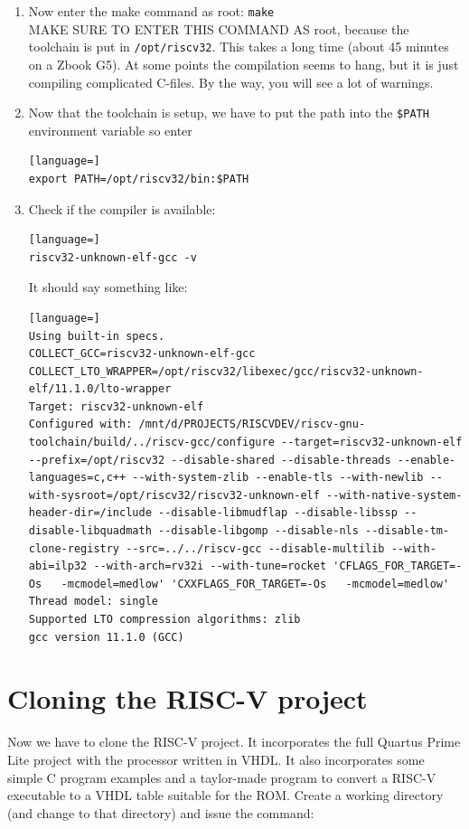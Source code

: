 \documentclass[12pt]{article}
\begin{document}
\begin{enumerate}
\item Now enter the make command as root: \lstinline|make|\\
MAKE SURE TO ENTER THIS COMMAND AS root, because the toolchain is put in \lstinline|/opt/riscv32|. This takes a long time (about 45 minutes on a Zbook G5). At some points the compilation seems to hang, but it is just compiling complicated C-files. By the way, you will see a lot of warnings.
\item Now that the toolchain is setup, we have to put the path into the \lstinline|$PATH| environment variable so enter
\begin{lstlisting}[language=]
export PATH=/opt/riscv32/bin:$PATH
\end{lstlisting}
\item Check if the compiler is available:
\begin{lstlisting}[language=]
riscv32-unknown-elf-gcc -v
\end{lstlisting}
It should say something like:
\begin{lstlisting}[language=]
Using built-in specs.
COLLECT_GCC=riscv32-unknown-elf-gcc
COLLECT_LTO_WRAPPER=/opt/riscv32/libexec/gcc/riscv32-unknown-elf/11.1.0/lto-wrapper
Target: riscv32-unknown-elf
Configured with: /mnt/d/PROJECTS/RISCVDEV/riscv-gnu-toolchain/build/../riscv-gcc/configure --target=riscv32-unknown-elf --prefix=/opt/riscv32 --disable-shared --disable-threads --enable-languages=c,c++ --with-system-zlib --enable-tls --with-newlib --with-sysroot=/opt/riscv32/riscv32-unknown-elf --with-native-system-header-dir=/include --disable-libmudflap --disable-libssp --disable-libquadmath --disable-libgomp --disable-nls --disable-tm-clone-registry --src=../../riscv-gcc --disable-multilib --with-abi=ilp32 --with-arch=rv32i --with-tune=rocket 'CFLAGS_FOR_TARGET=-Os   -mcmodel=medlow' 'CXXFLAGS_FOR_TARGET=-Os   -mcmodel=medlow'
Thread model: single
Supported LTO compression algorithms: zlib
gcc version 11.1.0 (GCC) 
\end{lstlisting}
\end{enumerate}

\section{Cloning the RISC-V project}
\label{sec:cloning}
Now we have to clone the RISC-V project. It incorporates the full Quartus Prime Lite project with the processor written in VHDL. It also incorporates some simple C program examples and a taylor-made program to convert a RISC-V executable to a VHDL table suitable for the ROM. Create a working directory (and change to that directory) and issue the command:
\end{document}
